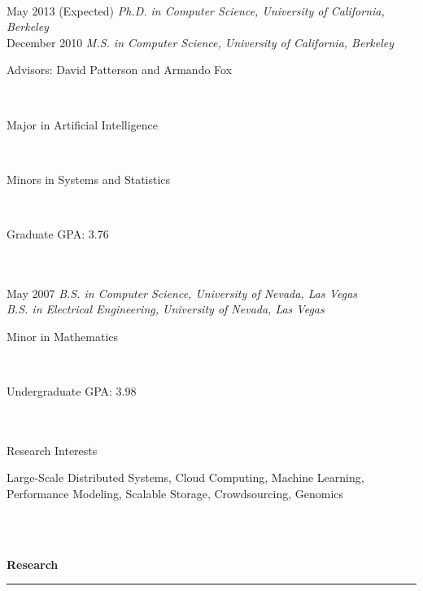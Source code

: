 \documentclass[11pt]{article}
\newcommand{\parwidth}{4.8 in}
\newcommand{\tabwidth}{2.0 in}
\newcommand{\head}[1]{
{\bf #1} \\
\rule{\textwidth}{0.01 in}

\vspace{-0.35 in}

}
\begin{document}
\begin{tabbing}
\hspace{\tabwidth} \= \\ 

May 2013 (Expected) \> \emph{Ph.D. in Computer Science, University of California, Berkeley} \\ 
December 2010 \> \emph{M.S. in Computer Science, University of California, Berkeley} \\ 
\> \parbox[t]{\parwidth}{Advisors: David Patterson and Armando Fox } \\ 
\> \parbox[t]{\parwidth}{Major in Artificial Intelligence} \\
\> \parbox[t]{\parwidth}{Minors in Systems and Statistics} \\
\> \parbox[t]{\parwidth}{Graduate GPA: 3.76} \\ \\

May 2007 \> \emph{B.S. in Computer Science, University of Nevada, Las Vegas} \\ 
\> \emph{B.S. in Electrical Engineering, University of Nevada, Las Vegas} \\ 
\> \parbox[t]{\parwidth}{Minor in Mathematics} \\
\> \parbox[t]{\parwidth}{Undergraduate GPA: 3.98} \\ \\

Research Interests \> \parbox[t]{\parwidth}{
Large-Scale Distributed Systems, Cloud Computing, Machine Learning, Performance Modeling, Scalable Storage, Crowdsourcing, Genomics
} \\ \\

\end{tabbing}



\head{Research}
\end{document}
